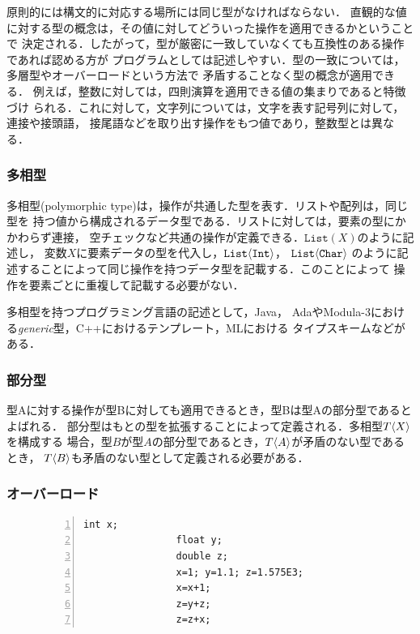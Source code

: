 \documentclass[a4j,dvipdfmx]{jbook}
\begin{document}
原則的には構文的に対応する場所には同じ型がなければならない．
直観的な値に対する型の概念は，その値に対してどういった操作を適用できるかということで
決定される．したがって，型が厳密に一致していなくても互換性のある操作であれば認める方が
プログラムとしては記述しやすい．型の一致については，多層型やオーバーロードという方法で
矛盾することなく型の概念が適用できる．
例えば，整数に対しては，四則演算を適用できる値の集まりであると特徴づけ
られる．これに対して，文字列については，文字を表す記号列に対して，連接や接頭語，
接尾語などを取り出す操作をもつ値であり，整数型とは異なる．

\subsubsection{多相型}

多相型(polymorphic type)は，操作が共通した型を表す．リストや配列は，同じ型を
持つ値から構成されるデータ型である．リストに対しては，要素の型にかかわらず連接，
空チェックなど共通の操作が定義できる．$\texttt{List}(X)$のように記述し，
変数$X$に要素データの型を代入し，$\texttt{List}\langle{\texttt{Int}}\rangle$，
$\texttt{List}\langle{\texttt{Char}}\rangle$
のように記述することによって同じ操作を持つデータ型を記載する．このことによって
操作を要素ごとに重複して記載する必要がない．

多相型を持つプログラミング言語の記述として，Java，
AdaやModula-3における{\em generic}型，C++におけるテンプレート，MLにおける
タイプスキームなどがある．

\subsubsection{部分型}

型Aに対する操作が型Bに対しても適用できるとき，型Bは型Aの部分型であるとよばれる．
部分型はもとの型を拡張することによって定義される．多相型$T\langle{X}\rangle$を構成する
場合，型$B$が型$A$の部分型であるとき，$T\langle{A}\rangle$が矛盾のない型であるとき，
$T\langle{B}\rangle$も矛盾のない型として定義される必要がある．

\subsubsection{オーバーロード}

\begin{figure}
    \vspace*{-10pt}
    \begin{minipage}{.3\linewidth}
        \begin{center}
            \begin{Verbatim}[numbers=left]
                int x;
                float y;
                double z;
                x=1; y=1.1; z=1.575E3;
                x=x+1;
                z=y+z;
                z=z+x;
            \end{Verbatim}
        \end{center}
    \end{minipage}
\end{figure}
\end{document}
